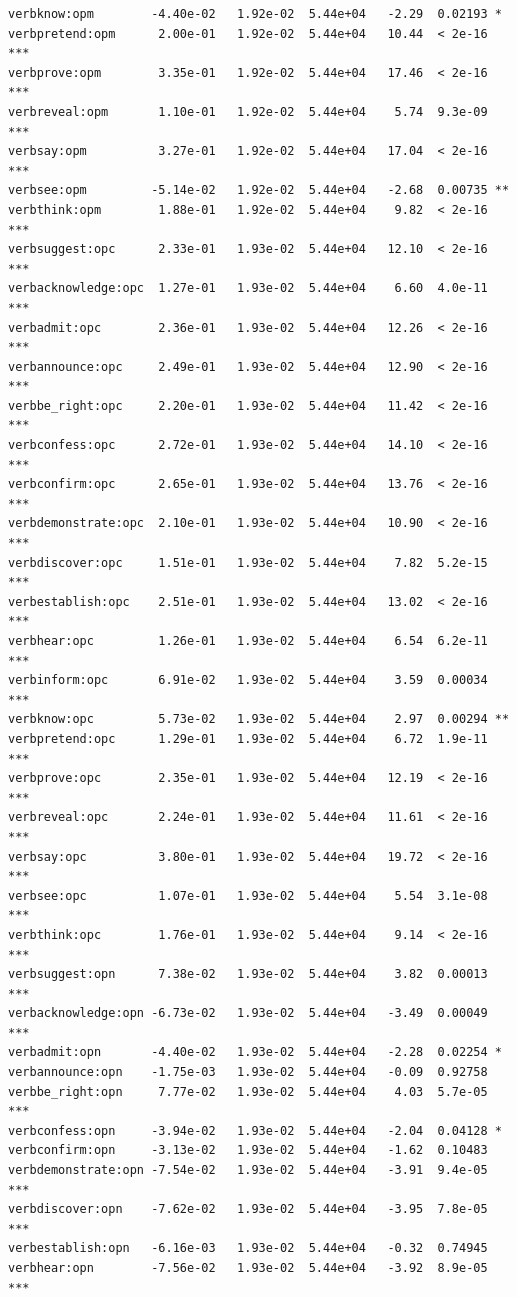 \documentclass[10pt]{article}\usepackage[]{graphicx}\usepackage[dvipsnames]{xcolor}
\makeatletter
\newenvironment{kframe}{%
 \def\at@end@of@kframe{}%
 \ifinner\ifhmode%
  \def\at@end@of@kframe{\end{minipage}}%
  \begin{minipage}{\columnwidth}%
 \fi\fi%
 \def\FrameCommand##1{\hskip\@totalleftmargin \hskip-\fboxsep
 \colorbox{shadecolor}{##1}\hskip-\fboxsep
     \hskip-\linewidth \hskip-\@totalleftmargin \hskip\columnwidth}%
 \MakeFramed {\advance\hsize-\width
   \@totalleftmargin\z@ \linewidth\hsize
   \@setminipage}}%
 {\par\unskip\endMakeFramed%
 \at@end@of@kframe}
\newenvironment{knitrout}{}{} %
\makeatother
\begin{document}
\begin{knitrout}
\begin{kframe}
\begin{verbatim}
verbknow:opm        -4.40e-02   1.92e-02  5.44e+04   -2.29  0.02193 *  
verbpretend:opm      2.00e-01   1.92e-02  5.44e+04   10.44  < 2e-16 ***
verbprove:opm        3.35e-01   1.92e-02  5.44e+04   17.46  < 2e-16 ***
verbreveal:opm       1.10e-01   1.92e-02  5.44e+04    5.74  9.3e-09 ***
verbsay:opm          3.27e-01   1.92e-02  5.44e+04   17.04  < 2e-16 ***
verbsee:opm         -5.14e-02   1.92e-02  5.44e+04   -2.68  0.00735 ** 
verbthink:opm        1.88e-01   1.92e-02  5.44e+04    9.82  < 2e-16 ***
verbsuggest:opc      2.33e-01   1.93e-02  5.44e+04   12.10  < 2e-16 ***
verbacknowledge:opc  1.27e-01   1.93e-02  5.44e+04    6.60  4.0e-11 ***
verbadmit:opc        2.36e-01   1.93e-02  5.44e+04   12.26  < 2e-16 ***
verbannounce:opc     2.49e-01   1.93e-02  5.44e+04   12.90  < 2e-16 ***
verbbe_right:opc     2.20e-01   1.93e-02  5.44e+04   11.42  < 2e-16 ***
verbconfess:opc      2.72e-01   1.93e-02  5.44e+04   14.10  < 2e-16 ***
verbconfirm:opc      2.65e-01   1.93e-02  5.44e+04   13.76  < 2e-16 ***
verbdemonstrate:opc  2.10e-01   1.93e-02  5.44e+04   10.90  < 2e-16 ***
verbdiscover:opc     1.51e-01   1.93e-02  5.44e+04    7.82  5.2e-15 ***
verbestablish:opc    2.51e-01   1.93e-02  5.44e+04   13.02  < 2e-16 ***
verbhear:opc         1.26e-01   1.93e-02  5.44e+04    6.54  6.2e-11 ***
verbinform:opc       6.91e-02   1.93e-02  5.44e+04    3.59  0.00034 ***
verbknow:opc         5.73e-02   1.93e-02  5.44e+04    2.97  0.00294 ** 
verbpretend:opc      1.29e-01   1.93e-02  5.44e+04    6.72  1.9e-11 ***
verbprove:opc        2.35e-01   1.93e-02  5.44e+04   12.19  < 2e-16 ***
verbreveal:opc       2.24e-01   1.93e-02  5.44e+04   11.61  < 2e-16 ***
verbsay:opc          3.80e-01   1.93e-02  5.44e+04   19.72  < 2e-16 ***
verbsee:opc          1.07e-01   1.93e-02  5.44e+04    5.54  3.1e-08 ***
verbthink:opc        1.76e-01   1.93e-02  5.44e+04    9.14  < 2e-16 ***
verbsuggest:opn      7.38e-02   1.93e-02  5.44e+04    3.82  0.00013 ***
verbacknowledge:opn -6.73e-02   1.93e-02  5.44e+04   -3.49  0.00049 ***
verbadmit:opn       -4.40e-02   1.93e-02  5.44e+04   -2.28  0.02254 *  
verbannounce:opn    -1.75e-03   1.93e-02  5.44e+04   -0.09  0.92758    
verbbe_right:opn     7.77e-02   1.93e-02  5.44e+04    4.03  5.7e-05 ***
verbconfess:opn     -3.94e-02   1.93e-02  5.44e+04   -2.04  0.04128 *  
verbconfirm:opn     -3.13e-02   1.93e-02  5.44e+04   -1.62  0.10483    
verbdemonstrate:opn -7.54e-02   1.93e-02  5.44e+04   -3.91  9.4e-05 ***
verbdiscover:opn    -7.62e-02   1.93e-02  5.44e+04   -3.95  7.8e-05 ***
verbestablish:opn   -6.16e-03   1.93e-02  5.44e+04   -0.32  0.74945    
verbhear:opn        -7.56e-02   1.93e-02  5.44e+04   -3.92  8.9e-05 ***

\end{verbatim}
\end{kframe}
\end{knitrout}
\end{document}
